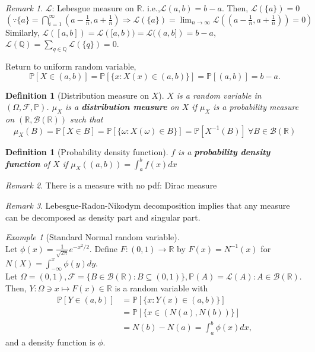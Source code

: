 \documentclass[12pt]{report}
\renewcommand{\1}{\mathbb{1}}
\renewcommand{\subset}{\subseteq}
\theoremstyle{break}
\theoremstyle{newdef}
\newtheorem{defn}[thm]{Definition} %
\theoremstyle{remark}
\newtheorem*{exmp}{Example} %
\newtheorem*{rem}{Remark} %
\begin{document}
\begin{rem}
$\mathcal{L}$: Lebesgue measure on $\mathbb{R}$. i.e.,$\mathcal{L}(a,b) = b-a$.
Then, $\mathcal{L}(\{a\}) = 0$\\
$(\because
\{a\} = \bigcap_{i=1}^\infty (a-\frac{1}{n}, a+\frac{1}{n})
\Rightarrow \mathcal{L}(\{a\}) = \lim_{n\rightarrow\infty} \mathcal{L}((a-\frac{1}{n}, a+\frac{1}{n})) = 0
)$\\
Similarly, $\mathcal{L}([a,b]) = \mathcal{L}([a,b)) = \mathcal{L}((a,b]) = b-a$,
$\mathcal{L}(\mathbb{Q}) = \sum_{q \in \mathbb{Q}}\mathcal{L}(\{q\}) = 0$.
\end{rem}

Return to uniform random variable,
$$\mathbb{P}[X \in (a,b)] = \mathbb{P}[\{x : X(x) \in (a,b)\}] = \mathbb{P}[(a,b)] = b-a.$$

\begin{defn}[Distribution measure on $X$]
$X$ is a random variable in $(\Omega, \mathcal{F}, \mathbb{P})$.
$\mu_X$ is a \textbf{distribution measure} on $X$ if $\mu_X$ is a probability measure on $(\mathbb{R}, \mathcal{B}(\mathbb{R}))$ such that 
$$
\mu_X(B) = \mathbb{P}[X \in B]
= \mathbb{P}[\{\omega : X(\omega) \in B\}]
= \mathbb{P}[X^{-1}(B)] \ \forall B \in \mathcal{B}(\mathbb{R})
$$
\end{defn}


\begin{defn}[Probability density function]
$f$ is a \textbf{probability density function} of $X$ if $\mu_X((a,b)) = \int_a^b f(x)dx$
\end{defn}

\begin{rem}
There is a measure with no pdf: Dirac measure
\end{rem}

\begin{rem}
Lebesgue-Radon-Nikodym decomposition implies that any measure can be decomposed as density part and singular part.
\end{rem}

\begin{exmp}[Standard Normal random variable]
\leavevmode\\
Let $\phi(x) = \frac{1}{\sqrt{2\pi}} e^{-x^2/2}$.
Define $F : (0,1) \rightarrow \mathbb{R}$ by $F(x) = N^{-1}(x)$ for $N(X) = \int_{-\infty}^x \phi(y)dy$.\\
Let $\Omega = (0,1), \mathcal{F} = \{B \in \mathcal{B}(\mathbb{R}) : B \subset (0,1)\}, \mathbb{P}(A) = \mathcal{L}(A) : A \in \mathcal{B}(\mathbb{R})$.\\
Then, $Y : \Omega \ni x \mapsto F(x) \in \mathbb{R}$ is a random variable with
$$
\begin{aligned}
\mathbb{P}[Y \in (a,b)]
&= \mathbb{P}[\{x : Y(x) \in (a,b)\}]\\
&= \mathbb{P}[\{x \in (N(a),N(b))\}]\\
&= N(b)-N(a) = \int_a^b \phi(x)dx,
\end{aligned}
$$
and a density function is $\phi$.
\end{exmp}
\end{document}
